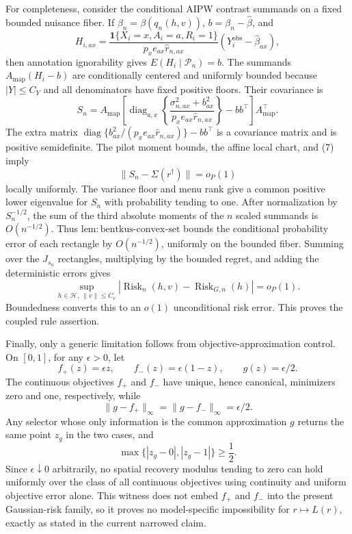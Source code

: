For completeness, consider the conditional AIPW contrast summands on a fixed bounded nuisance fiber.  If \(\beta_n=\beta(q_n(h,v))\), \(b=\beta_n-\widehat\beta\), and
\[
H_{i,ax}=\frac{\mathbf1\{X_i=x,A_i=a,R_i=1\}}
{p_xe_{ax}\widehat r_{n,ax}}
(Y_i^{\mathrm{obs}}-\widehat\beta_{ax}),
\]
then annotation ignorability gives \(E(H_i\mid\mathscr P_n)=b\).  The summands
\(A_{\mathrm{map}}(H_i-b)\) are conditionally centered and uniformly bounded because \(|Y|\le C_Y\) and all denominators have fixed positive floors.  Their covariance is
\[
S_n=A_{\mathrm{map}}\left[
\operatorname{diag}_{a,x}\left\{
\frac{\sigma^2_{n,ax}+b_{ax}^2}
{p_xe_{ax}\widehat r_{n,ax}}
\right\}-bb^\top\right]A_{\mathrm{map}}^\top.
\tag{8}
\]
The extra matrix
\(\operatorname{diag}\{b_{ax}^2/(p_xe_{ax}\widehat r_{n,ax})\}-bb^\top\)
is a covariance matrix and is positive semidefinite.  The pilot moment bounds, the affine local chart, and (7) imply
\[
\lVert S_n-\Sigma(r^\dagger)\rVert=o_P(1)
\tag{9}
\]
locally uniformly.  The variance floor and menu rank give a common positive lower eigenvalue for \(S_n\) with probability tending to one.  After normalization by \(S_n^{-1/2}\), the sum of the third absolute moments of the \(n\) scaled summands is \(O(n^{-1/2})\).  Thus \(\mathrm{lem:bentkus\text{-}convex\text{-}set}\) bounds the conditional probability error of each rectangle by \(O(n^{-1/2})\), uniformly on the bounded fiber.  Summing over the \(J_{s_n}\) rectangles, multiplying by the bounded regret, and adding the deterministic errors gives
\[
\sup_{h\in\mathcal H,\ \lVert v\rVert\le C_v}
|\operatorname{Risk}_{n}(h,v)-\operatorname{Risk}_{G,n}(h)|=o_P(1).
\]
Boundedness converts this to an \(o(1)\) unconditional risk error.  This proves the coupled rule assertion.

Finally, only a generic limitation follows from objective-approximation control.  On \([0,1]\), for any \(\epsilon>0\), let
\[
f_+(z)=\epsilon z,\qquad f_-(z)=\epsilon(1-z),
\qquad g(z)=\epsilon/2.
\]
The continuous objectives \(f_+\) and \(f_-\) have unique, hence canonical, minimizers zero and one, respectively, while
\[
\lVert g-f_+\rVert_\infty
=\lVert g-f_-\rVert_\infty=\epsilon/2.
\]
Any selector whose only information is the common approximation \(g\) returns the same point \(z_g\) in the two cases, and
\[
\max\{|z_g-0|,|z_g-1|\}\ge\frac12.
\]
Since \(\epsilon\downarrow0\) arbitrarily, no spatial recovery modulus tending to zero can hold uniformly over the class of all continuous objectives using continuity and uniform objective error alone.  This witness does not embed \(f_+\) and \(f_-\) into the present Gaussian-risk family, so it proves no model-specific impossibility for \(r\mapsto L(r)\), exactly as stated in the current narrowed claim.
